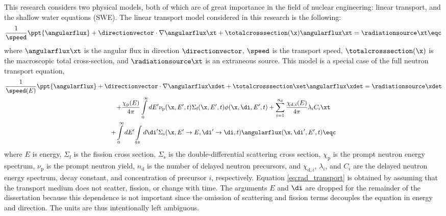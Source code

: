 This research considers two physical models, both of which are of
great importance in the field of nuclear engineering:
linear transport, and the shallow water equations (SWE).
The linear transport model considered in this research is the following:
\begin{equation}\label{eq:rad_transport}
  \frac{1}{\speed}\ppt{\angularflux} + \directionvector\cdot\nabla\angularflux\xt
  + \totalcrosssection(\x)\angularflux\xt = \radiationsource\xt \eqc
\end{equation}
where $\angularflux\xt$ is the angular flux in direction $\directionvector$,
$\speed$ is the transport speed, $\totalcrosssection(\x)$
is the macroscopic total cross-section, and $\radiationsource\xt$ is an
extraneous source.
This model is a special case of the full neutron transport equation,
\begin{multline}
  \frac{1}{\speed(E)}\ppt{\angularflux} + \directionvector\cdot\nabla\angularflux\xdet
    + \totalcrosssection\xet\angularflux\xdet = \radiationsource\xdet\\
    + \frac{\chi_\text{p}(E)}{4\pi}\int\limits_0^\infty
      dE'\nu_\text{p}(\x,E',t)\Sigma_\text{f}(\x,E',t)\phi(\x,\di,E',t)
    + \sum\limits_{i=1}^{n_\text{d}}\frac{\chi_{\text{d},i}(E)}{4\pi}\lambda_i C_i\xt\\
    + \int\limits_0^\infty dE'\int\limits_{4\pi}d\di'
      \Sigma_\text{s}(\x,E'\rightarrow E,\di'\rightarrow\di,t)\angularflux(\x,\di',E',t)
  \eqc
\end{multline}
where $E$ is energy, $\Sigma_\text{f}$ is the fission cross section, $\Sigma_\text{s}$ is the
double-differential scattering cross section, $\chi_\text{p}$ is the prompt
neutron energy spectrum, $\nu_\text{p}$ is the prompt
neutron yield, $n_\text{d}$ is the number of delayed neutron precursors,
and $\chi_{\text{d},i}$, $\lambda_i$, and $C_i$ are the delayed neutron
energy spectrum, decay constant, and concentration of precursor $i$, respectively.
Equation \eqref{eq:rad_transport} is obtained by assuming that the transport
medium does not scatter, fission, or change with time. The arguments
$E$ and $\di$ are dropped for the remainder of the dissertation
because this dependence is not important since the omission of scattering
and fission terms decouples the equation in energy and direction.
The units are thus intentionally left ambiguous.

